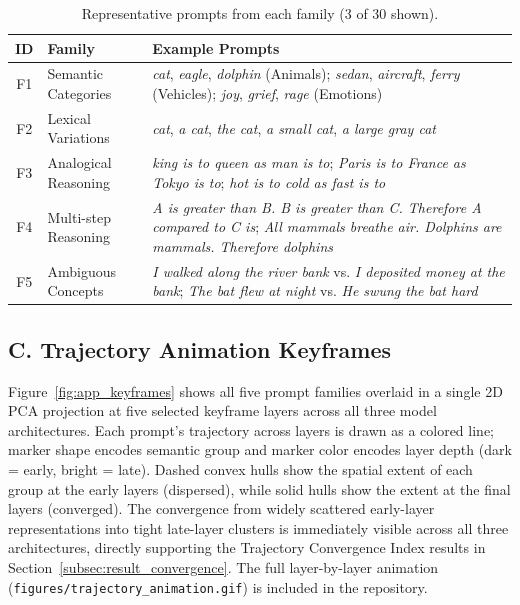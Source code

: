 \documentclass{article}
\begin{document}
\begin{table}[H]
\centering
\footnotesize
\caption{Representative prompts from each family (3 of 30 shown).}
\label{tab:app_prompts}
\begin{tabularx}{\columnwidth}{clX}
\toprule
\textbf{ID} & \textbf{Family} & \textbf{Example Prompts} \\
\midrule

F1 & Semantic Categories &
\textit{cat}, \textit{eagle}, \textit{dolphin} (Animals);
\textit{sedan}, \textit{aircraft}, \textit{ferry} (Vehicles);
\textit{joy}, \textit{grief}, \textit{rage} (Emotions) \\

\midrule

F2 & Lexical Variations &
\textit{cat}, \textit{a cat}, \textit{the cat},
\textit{a small cat}, \textit{a large gray cat} \\

\midrule

F3 & Analogical Reasoning &
\textit{king is to queen as man is to};
\textit{Paris is to France as Tokyo is to};
\textit{hot is to cold as fast is to} \\

\midrule

F4 & Multi-step Reasoning &
\textit{A is greater than B. B is greater than C. Therefore A compared to C is};
\textit{All mammals breathe air. Dolphins are mammals. Therefore dolphins} \\

\midrule

F5 & Ambiguous Concepts &
\textit{I walked along the river bank} vs.
\textit{I deposited money at the bank};
\textit{The bat flew at night} vs.
\textit{He swung the bat hard} \\

\bottomrule
\end{tabularx}
\end{table}

\subsection*{C. Trajectory Animation Keyframes}
\label{app:animation}

Figure~\ref{fig:app_keyframes} shows all five prompt families overlaid in a single 2D PCA projection at five selected keyframe layers across all three model architectures. Each prompt's trajectory across layers is drawn as a colored line; marker shape encodes semantic group and marker color encodes layer depth (dark = early, bright = late). Dashed convex hulls show the spatial extent of each group at the early layers (dispersed), while solid hulls show the extent at the final layers (converged). The convergence from widely scattered early-layer representations into tight late-layer clusters is immediately visible across all three architectures, directly supporting the Trajectory Convergence Index results in Section~\ref{subsec:result_convergence}. The full layer-by-layer animation (\texttt{figures/trajectory\_animation.gif}) is included in the repository.
\end{document}
